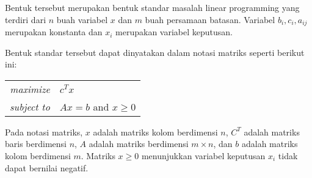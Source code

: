 Bentuk tersebut merupakan bentuk standar masalah linear programming yang terdiri dari $n$ buah variabel $x$ dan $m$ buah persamaan batasan. Variabel $b_i,c_i,a_{ij}$ merupakan konstanta dan $x_i$ merupakan variabel keputusan. 

Bentuk standar tersebut dapat dinyatakan dalam notasi matriks seperti berikut ini:
        
\begin{center}
	\begin{tabular}{r l}
    	\textit{maximize}   & $c^Tx$ \\
        \textit{subject to} & $Ax=b$ and $x\geq0$
	\end{tabular}    
\end{center}
        
Pada notasi matriks, $x$ adalah matriks kolom berdimensi $n$, $C^T$ adalah matriks baris berdimensi $n$, $A$ adalah matriks berdimensi $m\times n$, dan $b$ adalah matriks kolom berdimensi $m$. Matriks $x\geq0$ menunjukkan variabel keputusan $x_i$ tidak dapat bernilai negatif.
        

	

		
		
		
	
		
		
